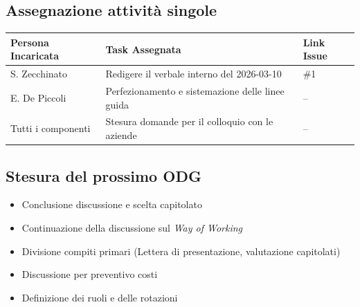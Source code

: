 \documentclass[a4paper, 10pt, colorlinks=true, linkcolor=black, urlcolor=blue, citecolor=blue, hidelinks]{article}
\begin{document}
\subsection{Assegnazione attività singole}
\begin{center}
\renewcommand{\arraystretch}{1.4}
\begin{tabular}{|p{4.2cm}|p{6.2cm}|p{2.2cm}|}
\hline
\textbf{Persona Incaricata} & \textbf{Task Assegnata} & \centering\textbf{Link Issue} \tabularnewline
\hline
S. Zecchinato & Redigere il verbale interno del 2026-03-10 & \centering \#1 \tabularnewline
\hline
E. De Piccoli & Perfezionamento e sistemazione delle linee guida & \centering  -- \tabularnewline
\hline
Tutti i componenti & Stesura domande per il colloquio con le aziende & \centering -- \tabularnewline
\hline
\end{tabular}
\end{center}

\subsection{Stesura del prossimo ODG}
\begin{itemize}
    \item Conclusione discussione e scelta capitolato 
    \item Continuazione della discussione sul \textit{Way of Working}
    \item Divisione compiti primari (Lettera di presentazione, valutazione capitolati)
    \item Discussione per preventivo costi 
    \item Definizione dei ruoli e delle rotazioni
\end{itemize}

\appendix
\end{document}
